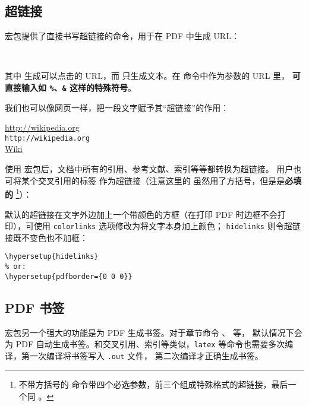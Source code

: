 \subsection{超链接}

 宏包提供了直接书写超链接的命令，用于在 PDF 中生成 URL：
\begin{command}
 \\
\end{command}

其中  生成可以点击的 URL，而  只生成文本。在  命令中作为参数的 URL 里，
\textbf{可直接输入如 \texttt\%、\texttt\& 这样的特殊符号}。

我们也可以像网页一样，把一段文字赋予其“超链接”的作用：
\begin{command}
\end{command}

\begin{example}
\url{http://wikipedia.org} \\
\nolinkurl{http://wikipedia.org} \\
\href{http://wikipedia.org}{Wiki}
\end{example}

使用  宏包后，文档中所有的引用、参考文献、索引等等都转换为超链接。
用户也可将某个交叉引用的标签  作为超链接（注意这里的  虽然用了方括号，但是是\textbf{必填的}%
\footnote{不带方括号的  命令带四个必选参数，前三个组成特殊格式的超链接，最后一个同 。}）：
\begin{command}
\end{command}

默认的超链接在文字外边加上一个带颜色的方框（在打印 PDF 时边框不会打印），可使用 \texttt{color\-links} 选项修改为将文字本身加上颜色；
\texttt{hide\-links} 则令超链接既不变色也不加框：
\begin{verbatim}
\hypersetup{hidelinks}
% or:
\hypersetup{pdfborder={0 0 0}}
\end{verbatim}

\subsection{PDF 书签}

 宏包另一个强大的功能是为 PDF 生成书签。对于章节命令 、 等，
默认情况下会为 PDF 自动生成书签。和交叉引用、索引等类似，\texttt{latex} 等命令也需要多次编译，第一次编译将书签写入 \texttt{.out} 文件，
第二次编译才正确生成书签。

